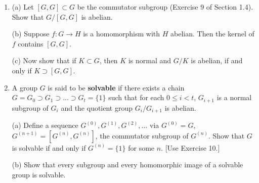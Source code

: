\documentclass[leqno]{book}
\begin{document}
\begin{enumerate}
(a) Show that the kernel of $\varphi$ is the center $Z(G)$ of $G$.  Conclude that $G/Z(G)\cong\operatorname{Inn}~G$.

(b) Establish a sequence of homomorphisms
$$\{1\}\to Z(G)\overset{\subset}{\to}G\overset{\varphi}{\to}\operatorname{Aut}(G)\to\operatorname{Out}(G)\to\{1\}$$
and show that the kernel of each homomorphism is equal to the image of the previous one.  [Such a sequence is called an \textbf{exact sequence} of homomorphisms.  However, exact sequences are rather restrictive because the image of a homomorphism can be any subgroup, whereas the kernel must be a normal subgroup.  Usually exact sequences are dealt with in abelian groups (written additively), where all subgroups are normal.]

(c) Show that a subgroup $N$ is normal if and only if $f(N)=N$ for all $f\in\operatorname{Inn}(G)$.

A subgroup $K\subset G$ is said to be \textbf{characteristic} if $f(K)=K$ for all $f\in\operatorname{Aut}(G)$.  It is clear from part (c) that every characteristic subgroup is normal.  But the converse is false [$\mathbb Z\times\{0\}$ is a normal subgroup of $\mathbb Z\times\mathbb Z$ which is not characteristic].

(d) If $K$ is a characteristic subgroup of $N$ and $N$ is a normal subgroup of $G$, show that $K$ is a normal subgroup of $G$.  [Compare with Exercise 7 of Section 1.4.]

\item (a) Let $[G,G]\subset G$ be the commutator subgroup (Exercise 9 of Section 1.4).  Show that $G/[G,G]$ is abelian.

(b) Suppose $f:G\to H$ is a homomorphism with $H$ abelian.  Then the kernel of $f$ contains $[G,G]$.

(c) Now show that if $K\subset G$, then $K$ is normal and $G/K$ is abelian, if and only if $K\supset[G,G]$.

\item A group $G$ is said to be \textbf{solvable} if there exists a chain $G=G_0\supset G_1\supset\dots\supset G_t=\{1\}$ such that for each $0\leqslant i<t$, $G_{i+1}$ is a normal subgroup of $G_i$ and the quotient group $G_i/G_{i+1}$ is abelian.

(a) Define a sequence $G^{(0)},G^{(1)},G^{(2)},\dots$ via $G^{(0)}=G$, $G^{(n+1)}=[G^{(n)},G^{(n)}]$, the commutator subgroup of $G^{(n)}$.  Show that $G$ is solvable if and only if $G^{(n)}=\{1\}$ for some $n$.  [Use Exercise 10.]

(b) Show that every subgroup and every homomorphic image of a solvable group is solvable.


\end{enumerate}
\end{document}
